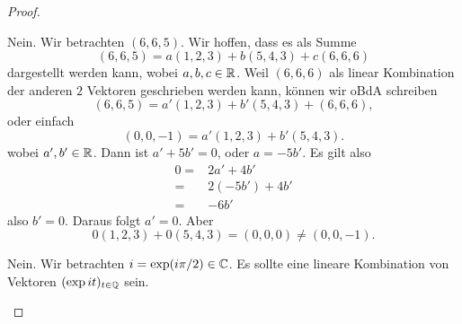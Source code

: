 \begin{proof}
	\begin{parts}
	\item Nein. Wir betrachten $(6,6,5)$. Wir hoffen, dass es als Summe
		\[
			(6,6,5)=a(1,2,3)+b(5,4,3)+c(6,6,6)
		\]
		dargestellt werden kann, wobei $a,b,c\in \mathbb{R}$. Weil $(6,6,6)$ als linear Kombination der anderen $2$ Vektoren geschrieben werden kann, können wir oBdA schreiben
		\[
			(6,6,5)=a'(1,2,3)+b'(5,4,3)+(6,6,6)
		,\]
		oder einfach
\[
	(0,0,-1)=a'(1,2,3)+b'(5,4,3)
.\] 
		wobei $a',b'\in \mathbb{R}$. Dann ist $a'+5b'=0$, oder $a=-5b'$. Es gilt also
		\begin{align*}
			0=&2a'+4b'\\
			=&2(-5b')+4b'\\
			=& -6b'
		\end{align*}
		also $b'=0$. Daraus folgt $a'=0$. Aber
		\[
		0(1,2,3)+0(5,4,3)=(0,0,0)\neq (0,0,-1)
		.\] 
	\item Nein. Wir betrachten $i=\exp(i\pi / 2)\in \mathbb{C}$. Es sollte eine lineare Kombination von Vektoren $(\exp it)_{t\in \mathbb{Q}}$ sein. 
	\end{parts}
\end{proof}
